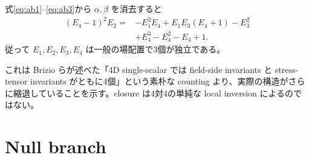 \documentclass[a4paper,11pt]{ltjsreport}
\begin{document}
式\eqref{eq:ab1}--\eqref{eq:ab3}から $\alpha,\beta$ を消去すると
\begin{equation}
 \begin{aligned}
 (E_4-1)^2E_2={}&-E_1^2E_4+E_1E_3(E_4+1)-E_3^2\\
 &+E_4^3-E_4^2-E_4+1.
 \end{aligned}
 \label{eq:invariant-relation}
\end{equation}
従って $E_1,E_2,E_3,E_4$ は一般の場配置で3個が独立である。

これは Brizio らが述べた「4D single-scalar では field-side invariants と stress-tensor invariants がともに4個」という素朴な counting より、実際の構造がさらに縮退していることを示す。closure は4対4の単純な local inversion によるのではない。

\section{Null branch}
\end{document}
